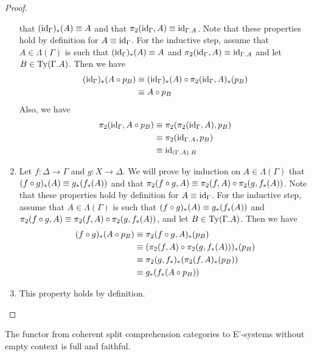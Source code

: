 \begin{proof}
\begin{enumerate}[label=(\alph*)]
that $({\mathrm{id}_{\Gamma}})_\ast(A)\equiv A$ and that $\pi_2(\catid{\Gamma},A)\jdeq \catid{\ctxext{\Gamma}{A}}$.
Note that these properties hold by definition for $A\equiv{\mathrm{id}_{\Gamma}}$. For the
inductive step, assume that $A\in\Lambda(\Gamma)$ is such that
$({\mathrm{id}_{\Gamma}})_\ast(A)\equiv A$ and $\pi_2(\catid{\Gamma},A)\jdeq
\catid{\ctxext{\Gamma}{A}}$ and let $B\in\mathrm{Ty}(\ctxext{\Gamma}{A})$. Then
we have
\begin{align*}
({\mathrm{id}_{\Gamma}})_\ast(A\circ p_B) & \equiv ({\mathrm{id}_{\Gamma}})_\ast(A)\circ \pi_2({\mathrm{id}_{\Gamma}},A)_\ast(p_B) \\
& \equiv A\circ p_B
\end{align*}
Also, we have
\begin{align*}
\pi_2(\catid{\Gamma},A\circ p_B) & \jdeq \pi_2(\pi_2(\catid{\Gamma},A),p_B) \\
& \jdeq \pi_2(\catid{\ctxext{\Gamma}{A}},p_B) \\
& \jdeq \catid{\ctxext{{\Gamma}{A}}{B}}
\end{align*}
\item Let $f:\Delta\to \Gamma$ and $g:X\to \Delta$. We will prove by induction
on $A\in\Lambda(\Gamma)$ that $(f\circ g)_\ast(A)\equiv g_\ast(f_\ast(A))$ and
that $\pi_2(f\circ g,A)\equiv \pi_2(f,A)\circ \pi_2(g,f_\ast(A))$. Note that
these properties hold by definition for $A\equiv{\mathrm{id}_{\Gamma}}$. For the inductive
step, assume that $A\in\Lambda(\Gamma)$ is such that $(f\circ g)_\ast(A)\equiv g_\ast(f_\ast(A))$ and
$\pi_2(f\circ g,A)\equiv \pi_2(f,A)\circ \pi_2(g,f_\ast(A))$, and let
$B\in\mathrm{Ty}(\ctxext{\Gamma}{A})$. Then we have
\begin{align*}
(f\circ g)_\ast(A\circ p_B) & \equiv \pi_2(f\circ g,A)_\ast(p_B) \\
& \equiv (\pi_2(f,A)\circ\pi_2(g,f_\ast(A)))_\ast(p_B) \\
& \equiv \pi_2(g,f_\ast)_\ast(\pi_2(f,A)_\ast(p_B)) \\
& \equiv g_\ast(f_\ast(A\circ p_B))
\end{align*}
\item This property holds by definition.\qedhere
\end{enumerate}
\end{proof}

\begin{conj}
The functor from coherent split comprehension categories to E'-systems without
empty context is full and faithful.
\end{conj}

